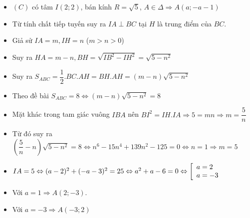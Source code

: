 \lgi 
\begin{minipage}{12cm}
\begin{itemize}[label=,leftmargin=*]
\item $(C)$ có tâm $I(2;2)$, bán kính $R=\sqrt{5}$, $A\in \Delta\Rightarrow A(a;-a-1)$
\item Từ tính chất tiếp tuyến suy ra $IA\perp BC$ tại $H$ là trung điểm của $BC$.
\item Giả sử $IA=m,IH=n$ ($m>n>0$)
\item Suy ra $HA=m-n,BH=\sqrt{IB^2-IH^2}=\sqrt{5-n^2}$
\item Suy ra $S_{ABC}=\dfrac{1}{2}.BC.AH=BH.AH=(m-n)\sqrt{5-n^2}$
\item Theo đề bài $S_{ABC}=8 \Leftrightarrow (m-n)\sqrt{5-n^2}=8$
\end{itemize}
\end{minipage}
\begin{itemize}[label=,leftmargin=*]
\item Mặt khác trong tam giác vuông $IBA$ nên $BI^2=IH.IA\Rightarrow 5=mn\Rightarrow m=\dfrac{5}{n}$
\item Từ đó suy ra $\left(\dfrac{5}{n}-n \right)\sqrt{5-n^2}=8\Leftrightarrow n^6-15n^4+139n^2-125=0 \Leftrightarrow n=1\Rightarrow m=5$
\item $IA=5\Leftrightarrow (a-2)^2+(-a-3)^2=25 \Leftrightarrow a^2+a-6=0\Leftrightarrow \left[\begin{array}{ll}a=2 \\ a=-3\end{array}\right.$
\item Với $a=1\Rightarrow A(2;-3)$.
\item Với $a=-3\Rightarrow A(-3;2)$
\end{itemize}

